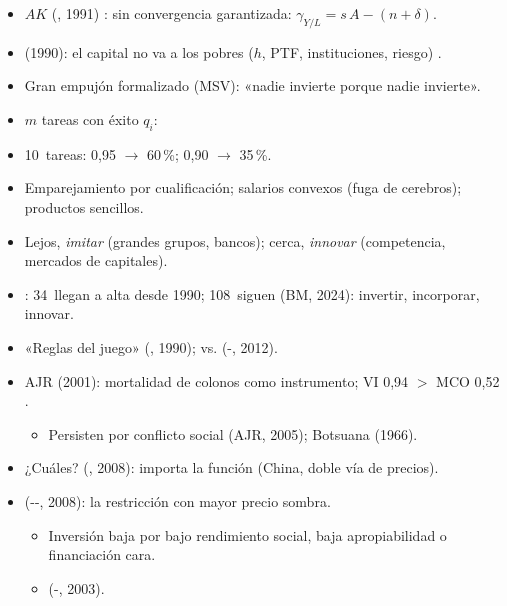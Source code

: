 \documentclass{article}
\begin{document}
\begin{columnas}
\begin{itemize}
\item $AK$ (, 1991) : sin convergencia garantizada: $\gamma_{Y/L}=s\,A-(n+\delta)$.
\item {} (1990): el capital no va a los pobres ($h$, PTF, instituciones, riesgo) .
\item Gran empujón formalizado (MSV): «nadie invierte porque nadie invierte».
\end{itemize}
\begin{itemize}
\item $m$ tareas con éxito $q_i$:
\item 10~tareas: 0,95 $\to$ 60\,\%; 0,90 $\to$ 35\,\%.
\item Emparejamiento por cualificación; salarios convexos (fuga de cerebros); productos sencillos.
\end{itemize}
\begin{itemize}
\item Lejos, \emph{imitar} (grandes grupos, bancos); cerca, \emph{innovar} (competencia, mercados de capitales).
\item {}: 34~llegan a alta desde 1990; 108~siguen (BM, 2024): invertir, incorporar, innovar.
\end{itemize}
\begin{itemize}
\item «Reglas del juego» (, 1990);  vs.  (-, 2012).
\item AJR (2001): mortalidad de colonos como instrumento; VI 0,94 $>$ MCO 0,52 .
  \begin{itemize}
  \item Persisten por conflicto social (AJR, 2005); Botsuana (1966).
  \end{itemize}
\item ¿Cuáles?  (, 2008): importa la función (China, doble vía de precios).
\item {} (--, 2008): la restricción con mayor precio sombra.
  \begin{itemize}
  \item Inversión baja por bajo rendimiento social, baja apropiabilidad o financiación cara.
  \item {} (-, 2003).
  \end{itemize}
\end{itemize}


\end{columnas}
\end{document}

